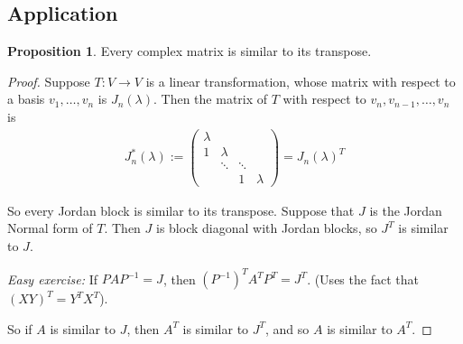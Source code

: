\documentclass{article}
\theoremstyle{definition} \newtheorem*{definition}{Definition}
\newtheorem{proposition}[theorem]{Proposition}
\begin{document}
\subsection{Application}
\begin{proposition}
  Every complex matrix is similar to its transpose.
  \label{prp:compmatsimtran}
\end{proposition}

\begin{proof}
  Suppose $T:V\rightarrow V$ is a linear transformation, whose matrix
  with respect to a basis $v_1,\dots,v_n$ is $J_n(\lambda)$. Then the 
  matrix of $T$ with respect to $v_n,v_{n-1},\dots,v_n$ is 
  \begin{align*}
    J_n^*(\lambda) := \left( 
    \begin{matrix}
      \lambda &&&\\
      1 &\lambda&&\\
      &\ddots&\ddots&\\
      &&1&\lambda
    \end{matrix}
    \right) = J_n(\lambda)^T
  \end{align*}

  So every Jordan block is similar to its transpose. Suppose that $J$ is 
  the Jordan Normal form of $T$. Then $J$ is block diagonal with Jordan
  blocks, so $J^T$ is similar to $J$.

  \textit{Easy exercise:} If $PAP^{-1} = J$, then $(P^{-1})^TA^TP^T=J^T$.
  (Uses the fact that $(XY)^T = Y^TX^T$).

  So if $A$ is similar to $J$, then $A^T$ is similar to $J^T$, and so
  $A$ is similar to $A^T$.
\end{proof} 
\end{document}

